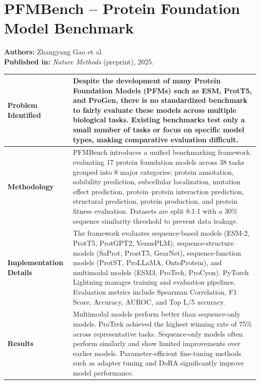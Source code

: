 \documentclass[12pt,a4paper]{report}
\begin{document}
\newpage

\section{PFMBench – Protein Foundation Model Benchmark}
\textbf{Authors:} Zhangyang Gao et al. \\
\textbf{Published in:} \textit{Nature Methods} (preprint), 2025.

\begin{table}[H]
\centering
\renewcommand{\arraystretch}{1.5}
\begin{tabular}{|p{}|p{}|}
\hline
\textbf{Problem Identified} & Despite the development of many Protein Foundation Models (PFMs) such as ESM, ProtT5, and ProGen, there is no standardized benchmark to fairly evaluate these models across multiple biological tasks. Existing benchmarks test only a small number of tasks or focus on specific model types, making comparative evaluation difficult. \\ \hline
\textbf{Methodology} & PFMBench introduces a unified benchmarking framework evaluating 17 protein foundation models across 38 tasks grouped into 8 major categories: protein annotation, solubility prediction, subcellular localization, mutation effect prediction, protein–protein interaction prediction, structural prediction, protein production, and protein fitness evaluation. Datasets are split 8:1:1 with a 30\% sequence similarity threshold to prevent data leakage. \\ \hline
\textbf{Implementation Details} & The framework evaluates sequence-based models (ESM-2, ProtT5, ProtGPT2, VenusPLM), sequence-structure models (SaProt, ProstT5, GearNet), sequence-function models (ProtST, ProLLaMA, OntoProtein), and multimodal models (ESM3, ProTrek, ProCyon). PyTorch Lightning manages training and evaluation pipelines. Evaluation metrics include Spearman Correlation, F1 Score, Accuracy, AUROC, and Top L/5 accuracy. \\ \hline
\textbf{Results} & Multimodal models perform better than sequence-only models. ProTrek achieved the highest winning rate of 75\% across representative tasks. Sequence-only models often perform similarly and show limited improvements over earlier models. Parameter-efficient fine-tuning methods such as adapter tuning and DoRA significantly improve model performance. \\ \hline
\end{tabular}
\end{table}
\end{document}
